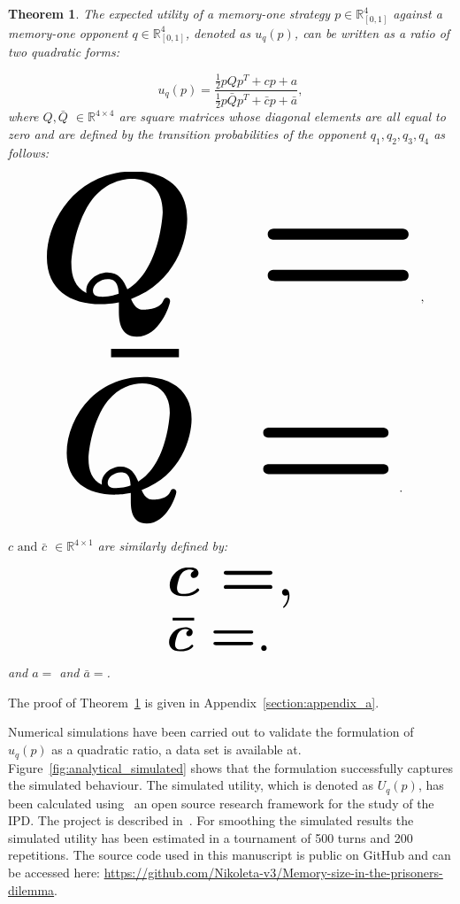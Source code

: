 \documentclass[10pt]{article}
\newcommand{\R}{\mathbb{R}}
\newtheorem{theorem}{Theorem}
\begin{document}
\begin{theorem}\label{theorem:quadratic_form_u}
    The expected utility of a memory-one strategy \(p\in\mathbb{R}_{[0,1]}^4\)
    against a memory-one opponent \(q\in\mathbb{R}_{[0,1]}^4\), denoted
    as \(u_q(p)\), can be written as a ratio of two quadratic forms:

    \begin{equation}\label{eq:optimisation_quadratic}
    u_q(p) = \frac{\frac{1}{2}pQp^T + cp + a}
                {\frac{1}{2}p\bar{Q}p^T + \bar{c}p + \bar{a}},
    \end{equation}
    where \(Q, \bar{Q}\) \(\in \R^{4\times4}\) are square matrices whose
    diagonal elements are all equal to zero and are defined by the
    transition probabilities of the opponent \(q_1, q_2, q_3, q_4\) as follows:

    \begin{center}
    \begin{equation}
    \resizebox{0.9\linewidth}{!}{\arraycolsep=2.5pt%
    \boldmath\(
    Q = \)},
    \end{equation}
    \begin{equation}\label{eq:q_bar_matrix}
    \resizebox{0.8\linewidth}{!}{\arraycolsep=2.5pt%
    \boldmath\(
    \bar{Q} =  \)}.
    \end{equation}
    \end{center}

    \(c \text{ and } \bar{c}\) \(\in \R^{4 \times 1}\) are similarly defined by:

    \begin{equation}\label{eq:q_matrix_numerator}
    \resizebox{0.3\linewidth}{!}{\arraycolsep=2.5pt%
    \boldmath\(c = \),}
    \end{equation}
    \begin{equation}\label{eq:q_matrix_denominator}
    \resizebox{0.3\linewidth}{!}{\arraycolsep=2.5pt%
    \boldmath\(\bar{c} = \).
    }
    \end{equation}
    and \(a = \) and
    \(\bar{a} = \).
\end{theorem}

The proof of Theorem~\ref{theorem:quadratic_form_u} is given in Appendix~\ref{section:appendix_a}.

Numerical simulations have been carried out to validate the formulation of
\(u_q(p)\) as a quadratic ratio, a data set is available at.
Figure~\ref{fig:analytical_simulated} shows that the formulation successfully
captures the simulated behaviour. The simulated utility, which is denoted as
\(U_q(p)\), has been calculated using~\cite{axelrodproject} an open source
research framework for the study of the IPD. The project is described
in~\cite{Knight2016}. For smoothing the simulated results the
simulated utility has been estimated in a tournament of 500 turns and 200
repetitions. The source code used in this manuscript is public on GitHub and
can be accessed here: \url{https://github.com/Nikoleta-v3/Memory-size-in-the-prisoners-dilemma}.
\end{document}
